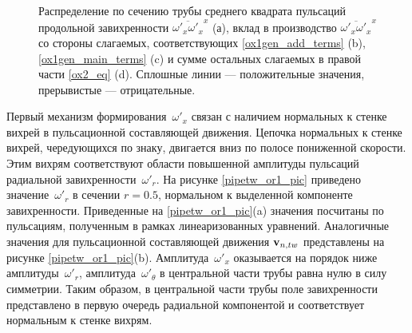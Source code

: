 \begin{figure}
\caption{Распределение по сечению трубы среднего квадрата пульсаций продольной завихренности $\overline{\omega'_x \omega'_x }^x$ (а), вклад в производство $\overline{\omega'_x \omega'_x }^x$ со стороны слагаемых, соответствующих \eqref{ox1gen_add_terms} (b), \eqref{ox1gen_main_terms} (c) и сумме остальных слагаемых в правой части \eqref{ox2_eq} (d). Сплошные линии --- положительные значения, прерывистые --- отрицательные.}
\label{ox1gen_pic}
\end{figure}


Первый механизм формирования~$\omega'_x$ связан с наличием нормальных к стенке вихрей в пульсационной составляющей движения. Цепочка нормальных к стенке вихрей, чередующихся по знаку, двигается вниз по полосе пониженной скорости. Этим вихрям соответствуют области повышенной амплитуды пульсаций радиальной завихренности~$\omega'_r$. На рисунке \ref{pipetw_or1_pic} приведено значение~$\omega'_r$ в сечении $r = 0.5$, нормальном к выделенной компоненте завихренности. Приведенные на \ref{pipetw_or1_pic}(a) значения посчитаны по пульсациям, полученным в рамках линеаризованных уравнений. Аналогичные значения для пульсационной составляющей движения $\mathbf{v}_{n,tw}$ представлены на рисунке \ref{pipetw_or1_pic}(b). Амплитуда~$\omega'_x$ оказывается на порядок ниже амплитуды~$\omega'_r$, амплитуда~$\omega'_\theta$ в центральной части трубы равна нулю в силу симметрии. Таким образом, в центральной части трубы поле завихренности представлено в первую очередь радиальной компонентой и соответствует нормальным к стенке вихрям.

